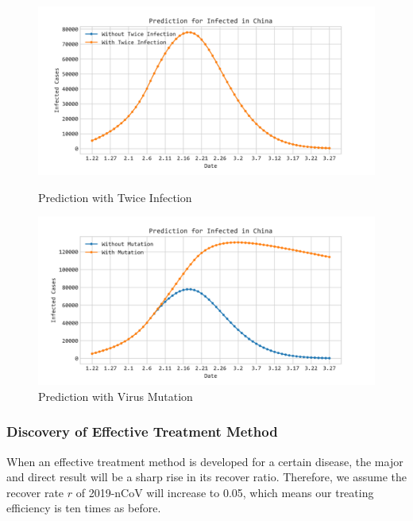 \documentclass[12pt]{mcmthesis}
\begin{document}
\begin{figure}[htbp]
    \centering
        \begin{minipage}[c]{0.48\textwidth}
            \includegraphics[width=1.0\textwidth]{053/figure/Prediction_With_Twice_Inf.png}
            \caption{Prediction with Twice Infection}
            \label{fig:Twice_Inf}
        \end{minipage}
        \begin{minipage}[c]{0.48\textwidth}
            \includegraphics[width=1.0\textwidth]{figure/Prediction_With_Mutation.png}
            \caption{Prediction with Virus Mutation}
            \label{fig:Mutation}
        \end{minipage}
\end{figure}

\subsubsection{Discovery of Effective Treatment Method} \label{subsubSec:treat}
When an effective treatment method is developed for a certain disease, the major and direct result will be a sharp rise in its recover ratio. Therefore, we assume the recover rate $r$ of 2019-nCoV will increase to 0.05, which means our treating efficiency is ten times as before.
\end{document}
